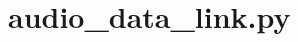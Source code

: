 \label{appendix:audio-data-link}
\chapter{audio\_data\_link.py}

\inputminted{python}{code/audio_data_link.py}
